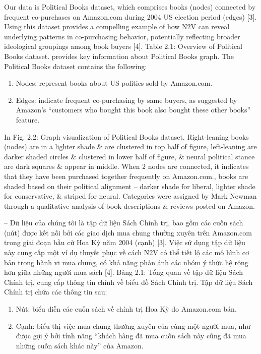\documentclass{article}
\begin{document}
\begin{itemize}
\begin{itemize}
\begin{enumerate}
        \end{enumerate}
        Our data is Political Books dataset, which comprises books (nodes) connected by frequent co-purchases on Amazon.com during 2004 US election period (edges) [3]. Using this dataset provides a compelling example of how N2V can reveal underlying patterns in co-purchasing behavior, potentially reflecting broader ideological groupings among book buyers [4]. {\sf Table 2.1: Overview of Political Books dataset.} provides key information about Political Books graph. The Political Books dataset contains the following:
        \begin{enumerate}
            \item Nodes: represent books about US politics sold by Amazon.com.
            \item Edges: indicate frequent co-purchasing by same buyers, as suggested by Amazon's ``customers who bought this book also bought these other books'' feature.
        \end{enumerate}
        In {\sf Fig. 2.2: Graph visualization of Political Books dataset. Right-leaning books (nodes) are in a lighter shade \& are clustered in top half of figure, left-leaning are darker shaded circles \& clustered in lower half of figure, \& neural political stance are dark squares \& appear in middle. When 2 nodes are connected, it indicates that they have been purchased together frequently on Amazon.com.}, books are shaded based on their political alignment -- darker shade for liberal, lighter shade for conservative, \& striped for neural. Categories were assigned by {\sc Mark Newman} through a qualitative analysis of book descriptions \& reviews posted on Amazon.

        -- Dữ liệu của chúng tôi là tập dữ liệu Sách Chính trị, bao gồm các cuốn sách (nút) được kết nối bởi các giao dịch mua chung thường xuyên trên Amazon.com trong giai đoạn bầu cử Hoa Kỳ năm 2004 (cạnh) [3]. Việc sử dụng tập dữ liệu này cung cấp một ví dụ thuyết phục về cách N2V có thể tiết lộ các mô hình cơ bản trong hành vi mua chung, có khả năng phản ánh các nhóm ý thức hệ rộng hơn giữa những người mua sách [4]. {\sf Bảng 2.1: Tổng quan về tập dữ liệu Sách Chính trị.} cung cấp thông tin chính về biểu đồ Sách Chính trị. Tập dữ liệu Sách Chính trị chứa các thông tin sau:

        \begin{enumerate}
            \item Nút: biểu diễn các cuốn sách về chính trị Hoa Kỳ do Amazon.com bán.
            \item Cạnh: biểu thị việc mua chung thường xuyên của cùng một người mua, như được gợi ý bởi tính năng ``khách hàng đã mua cuốn sách này cũng đã mua những cuốn sách khác này'' của Amazon.


\end{enumerate}
\end{itemize}
\end{itemize}
\end{document}

